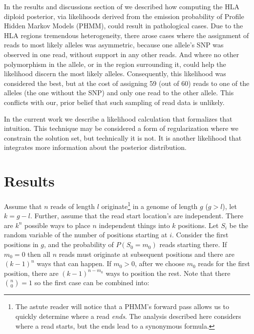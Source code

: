 In the results and discussions section of \cite{Prohlatype} we described how
computing the HLA diploid posterior,
via likelihoods derived from the emission probability of Profile Hidden Markov Models (PHMM),
could result in pathological cases.
Due to the HLA regions tremendous heterogeneity,
there arose cases where the assignment of reads to most likely alleles was asymmetric,
because one allele's SNP was observed in one read,
without support in any other reads.
And where no other polymorphism in the allele, or in the region surrounding it,
could help the likelihood discern the most likely alleles.
Consequently, this likelihood was considered the best, but at the cost of assigning 59 (out of 60)
reads to one of the alleles (the one without the SNP) and only one read to the other allele.
This conflicts with our, prior belief that such sampling of read data is unlikely.

In the current work we describe a likelihood calculation that formalizes that intuition.
This technique may be considered a form of regularization\cite{TODO} where we
constrain the solution set, but technically it is not.
It is another likelihood that integrates more information about the posterior
distribution.

\section{Results}

Assume that $n$ reads of length $l$ originate\footnote{The astute reader will
notice that a PHMM's forward pass allows us to quickly determine where a read
\emph{ends}. The analysis described here considers where a read starts, but the
ends lead to a synonymous formula.}
in a genome of length $g$ ($g>l$), let $k=g-l$.
Further, assume that the read start location's are independent.
There are $k^{n}$ possible ways to place $n$ independent things into $k$ positions.
Let $S_{i}$ be the random variable of the number of positions starting at $i$.
Consider the first positions in $g$, and the probability of $P(S_{0} = m_{0})$ reads starting there.
If $m_0=0$ then all $n$ reads must originate at subsequent positions and there
are $(k-1)^{n}$ ways that can happen.
If $m_0 > 0$, after we choose $m_0$ reads for the first position,
there are $(k-1)^{n-m_{0}}$ ways to position the rest.
Note that there ${n \choose 0} = 1$ so the first case can be combined into:

